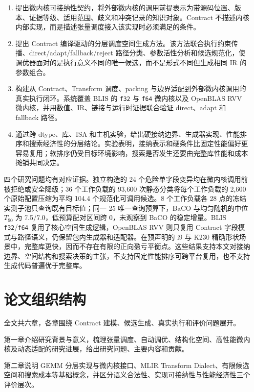 \begin{enumerate}[label={（\arabic*）}]
  \item 提出微内核可接纳性契约，将外部微内核的调用前提表示为带源码位置、版本、证据等级、适用范围、歧义和冲突记录的知识对象。Contract 不描述内核内部实现，而是描述张量调度接入该实现时必须满足的条件。

  \item 提出 Contract 编译驱动的分层调度空间生成方法。该方法联合执行约束传播、direct/adapt/fallback/reject 路径分类、参数活性分析和候选规范化，使调优器面对的是执行意义不同的唯一候选，而不是形式不同但生成相同 IR 的参数组合。

  \item 构建从 Contract、Transform 调度、packing 与边界适配到外部微内核调用的真实执行闭环。系统覆盖 BLIS 的 \texttt{f32} 与 \texttt{f64} 微内核以及 OpenBLAS RVV 微内核，并用数值、IR、链接与运行时证据联合验证 direct、adapt 和 fallback 路径。

  \item 通过跨 dtype、库、ISA 和主机实验，给出硬接纳边界、生成器实现、性能排序和搜索经济性的分层结论。实验表明，接纳表示和硬条件比固定性能偏好更容易复用；软排序仍受目标环境影响，搜索是否发生还要由完整库性能和成本摊销共同决定。
\end{enumerate}

四个研究问题均有对应证据。独立构造的 24 个危险单字段变异均在微内核调用前被拒绝或安全降级；36 个工作负载的 93,600 次静态分类将每个工作负载的 2,600 个原始配置压缩为平均 104.4 个规范化可调用候选。8 个工作负载各 28 点的冻结实测子池只查询既有目标值；同一 25 唯一查询预算下，BaCO 与均匀随机的中位 $T_{90}$ 为 7.5/7.0，低预算配对区间跨 0，未观察到 BaCO 的稳定增量。BLIS \texttt{f32}/\texttt{f64} 复用了核心空间生成逻辑，OpenBLAS RVV 则只复用 Contract 字段模式与路径语义，仍保留包内生成器和适配器。在预声明的 i9 与 K230 精确形状场景中，完整库更快，因而不存在有限的正向盈亏平衡点。这些结果支持本文对接纳边界、空间结构和搜索决策的主张，不支持固定性能排序可跨平台复用，也不支持生成代码普遍优于完整库。

\section{论文组织结构}

全文共六章，各章围绕 Contract 建模、候选生成、真实执行和评价问题展开。

第一章介绍研究背景与意义，梳理张量调度、自动调优、结构化空间、高性能微内核及动态适配的研究进展，给出研究问题、主要内容和贡献。

第二章说明 GEMM 分层实现与微内核接口、MLIR Transform Dialect、有限候选空间和搜索成本等基础概念，并区分语义合法性、实现可接纳性与性能经济性三个评价层次。


